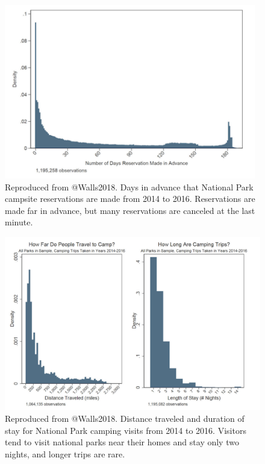 \documentclass[
]{book}
\begin{document}
\begin{figure}
\includegraphics[width=4.32in]{images/problem_statement_figure_2} \caption{Reproduced from @Walls2018. Days in advance that National Park campsite reservations are made from 2014 to 2016. Reservations are made far in advance, but many reservations are canceled at the last minute.}\label{fig:fig2}
\end{figure}

\begin{figure}
\includegraphics[width=6.4in]{images/problem_statement_figure_3} \caption{Reproduced from @Walls2018. Distance traveled and duration of stay for National Park camping visits from 2014 to 2016. Visitors tend to visit national parks near their homes and stay only two nights, and longer trips are rare.}\label{fig:fig3}
\end{figure}
\end{document}

